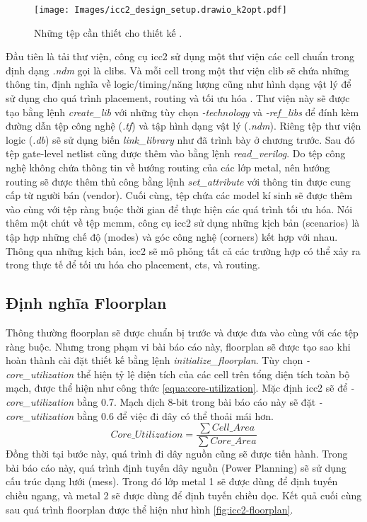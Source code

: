 \begin{figure}[htp]
\centering
\captionsetup{justification=centering,margin=2cm}
\texttt{[image: Images/icc2\_design\_setup.drawio\_k2opt.pdf]}
\caption{Những tệp cần thiết cho thiết kế \cite{synopsys-iccompilerii}.}
\label{fig:design-setup}
\end{figure}

Đầu tiên là tải thư viện, công cụ \acrshort{icc2} sử dụng một thư viện các cell chuẩn trong định dạng \textit{.ndm} gọi là \acrfull{clib}s. Và mỗi cell trong một thư viện \acrshort{clib} sẽ chứa những thông tin, định nghĩa về logic/timing/năng lượng cũng như hình dạng vật lý để sử dụng cho quá trình placement, routing và tối ưu hóa \cite{synopsys-iccompilerii}. Thư viện này sẽ được tạo bằng lệnh \textit{create\_lib} với những tùy chọn \textit{-technology} và \textit{-ref\_libs} để đính kèm đường dẫn tệp công nghệ (\textit{.tf}) và tập hình dạng vật lý (\textit{.ndm}). Riêng tệp thư viện logic (\textit{.db}) sẽ sử dụng biến \textit{link\_library} như đã trình bày ở chương trước. Sau đó tệp gate-level netlist cũng được thêm vào bằng lệnh \textit{read\_verilog}. Do tệp công nghệ không chứa thông tin về hướng routing của các lớp metal, nên hướng routing sẽ được thêm thủ công bằng lệnh \textit{set\_attribute} với thông tin được cung cấp từ người bán (vendor). Cuối cùng, tệp chứa các model kí sinh sẽ được thêm vào cùng với tệp ràng buộc thời gian để thực hiện các quá trình tối ưu hóa. Nói thêm một chút về tệp \acrfull{mcmm}, công cụ \acrshort{icc2} sử dụng những kịch bản (scenarios) là tập hợp những chế độ (modes) và góc công nghệ (corners) kết hợp với nhau. Thông qua những kịch bản, \acrshort{icc2} sẽ mô phỏng tất cả các trường hợp có thể xảy ra trong thực tế để tối ưu hóa cho placement, \acrshort{cts}, và routing.

\subsection{Định nghĩa Floorplan}

Thông thường floorplan sẽ được chuẩn bị trước và được đưa vào cùng với các tệp ràng buộc. Nhưng trong phạm vi bài báo cáo này, floorplan sẽ được tạo sao khi hoàn thành cài đặt thiết kế bằng lệnh \textit{initialize\_floorplan}. Tùy chọn \textit{-core\_utilization} thể hiện tỷ lệ diện tích của các cell trên tổng diện tích toàn bộ mạch, được thể hiện như công thức \ref{equa:core-utilization}. Mặc định \acrshort{icc2} sẽ để \textit{-core\_utilization} bằng 0.7. Mạch dịch 8-bit trong bài báo cáo này sẽ đặt \textit{-core\_utilization} bằng 0.6 để việc đi dây có thể thoải mái hơn.
\begin{equation} \label{equa:core-utilization}
    Core\_Utilization = \frac{\sum Cell\_Area}{\sum Core\_Area}
\end{equation}
Đồng thời tại bước này, quá trình đi dây nguồn cũng sẽ được tiến hành. Trong bài báo cáo này, quá trình định tuyến dây nguồn (Power Planning) sẽ sử dụng cấu trúc dạng lưới (mess). Trong đó lớp metal 1 sẽ được dùng để định tuyến chiều ngang, và metal 2 sẽ được dùng để định tuyến chiều dọc. Kết quả cuối cùng sau quá trình floorplan được thể hiện như hình \ref{fig:icc2-floorplan}.

